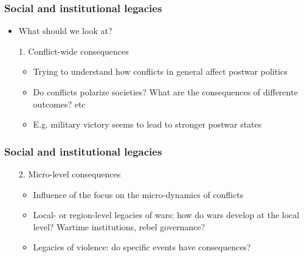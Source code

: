 \documentclass[aspectratio=43]{beamer}
\begin{document}


\begin{frame}
\frametitle{Social and institutional legacies}
\centering

\begin{itemize}[<+->]
  \item What should we look at?
  \item[1.] Conflict-wide consequences
  \begin{itemize}
    \item Trying to understand how conflicts in general affect postwar politics
    \item Do conflicts polarize societies? What are the consequences of differente outcomes? etc
    \item E.g. military victory seems to lead to stronger postwar states
  \end{itemize}
\end{itemize}

\end{frame}

\begin{frame}
\frametitle{Social and institutional legacies}
\centering

\begin{itemize}[<+->]
  \item[2.] Micro-level consequences
  \begin{itemize}
    \item Influence of the focus on the micro-dynamics of conflicts
    \item Local- or region-level legacies of wars: how do wars develop at the local level? Wartime institutions, rebel governance?
    \item Legacies of violence: do specific events have consequences?
  \end{itemize}
\end{itemize}

\end{frame}
\end{document}
